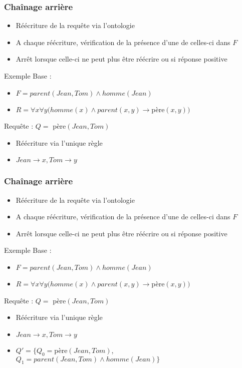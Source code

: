 \begin{frame}
	\frametitle{Chaînage arrière}
	\begin{itemize}
		\item Réécriture de la requête via l'ontologie
		\item A chaque réécriture, vérification de la présence d'une de celles-ci dans
		$F$
		\item Arrêt lorsque celle-ci ne peut plus être réécrire ou si réponse positive
	\end{itemize}
	\begin{exampleblock}{Exemple}
	Base :
	\begin{itemize}
		\item $F = parent(Jean,Tom) \wedge homme(Jean)$
		\item $R = \forall x \forall y (homme(x) \wedge parent(x,y) \rightarrow
		$père$(x,y))$
	\end{itemize}
	Requête : $Q = $ père$(Jean,Tom)$\\
	\begin{itemize}
		\item Réécriture via l'unique règle
		\item $Jean \rightarrow x, Tom \rightarrow y$
	\end{itemize}
	\end{exampleblock}
\end{frame}


\begin{frame}
	\frametitle{Chaînage arrière}
	\begin{itemize}
		\item Réécriture de la requête via l'ontologie
		\item A chaque réécriture, vérification de la présence d'une de celles-ci dans
		$F$
		\item Arrêt lorsque celle-ci ne peut plus être réécrire ou si réponse positive
	\end{itemize}
	\begin{exampleblock}{Exemple}
	Base :
	\begin{itemize}
		\item $F = parent(Jean,Tom) \wedge homme(Jean)$
		\item $R = \forall x \forall y (homme(x) \wedge parent(x,y) \rightarrow
		$père$(x,y))$
	\end{itemize}
	Requête : $Q = $ père$(Jean,Tom)$\\
	\begin{itemize}
		\item Réécriture via l'unique règle
		\item $Jean \rightarrow x, Tom \rightarrow y$
		\item $Q' = \{Q_0 = $père$(Jean,Tom)$, $Q_1 = parent(Jean,Tom) \wedge
		homme(Jean) \}$
	\end{itemize}
	\end{exampleblock}
\end{frame}


